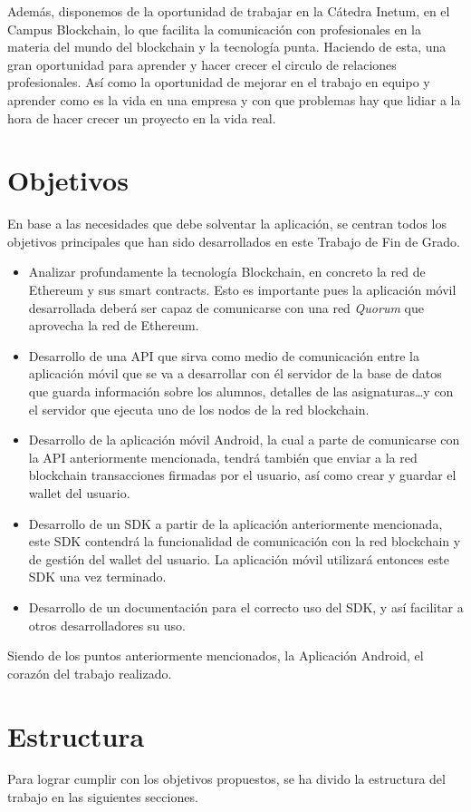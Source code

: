 Además, disponemos de la oportunidad de trabajar en la Cátedra Inetum, en el Campus Blockchain, lo que facilita la comunicación con profesionales en la materia del mundo del blockchain y la tecnología punta. Haciendo de esta, una gran oportunidad para aprender y hacer crecer el circulo de relaciones profesionales. Así como la oportunidad de mejorar en el trabajo en equipo y aprender como es la vida en una empresa y con que problemas hay que lidiar a la hora de hacer crecer un proyecto en la vida real.

\section{Objetivos}

En base a las necesidades que debe solventar la aplicación, se centran todos los objetivos principales que han sido desarrollados en este Trabajo de Fin de Grado.
\begin{itemize}
\item Analizar profundamente la tecnología Blockchain, en concreto la red de Ethereum y sus smart contracts. Esto es importante pues la aplicación móvil desarrollada deberá ser capaz de comunicarse con una red \emph{Quorum} que aprovecha la red de Ethereum.
\item Desarrollo de una API que sirva como medio de comunicación entre la aplicación móvil que se va a desarrollar con él servidor de la base de datos que guarda información sobre los alumnos, detalles de las asignaturas\dots y con el servidor que ejecuta uno de los nodos de la red blockchain. 
\item Desarrollo de la aplicación móvil Android, la cual a parte de comunicarse con la API anteriormente mencionada, tendrá también que enviar a la red blockchain transacciones firmadas por el usuario, así como crear y guardar el wallet del usuario. 
\item Desarrollo de un SDK a partir de la aplicación anteriormente mencionada, este SDK contendrá la funcionalidad de comunicación con la red blockchain y de gestión del wallet del usuario. La aplicación móvil utilizará entonces este SDK una vez terminado. 
\item Desarrollo de un documentación para el correcto uso del SDK, y así facilitar a otros desarrolladores su uso.
\end{itemize}
Siendo de los puntos anteriormente mencionados, la Aplicación Android, el corazón del trabajo realizado.

\section{Estructura}
Para lograr cumplir con los objetivos propuestos, se ha divido la estructura del trabajo en las siguientes secciones. \\

